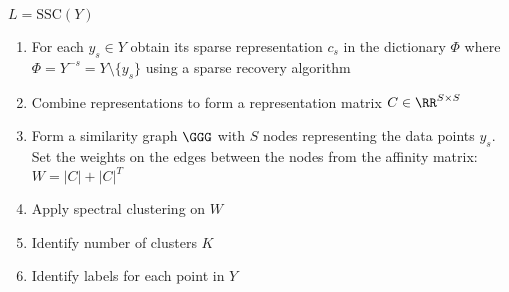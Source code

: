 \documentclass[../article_algorithms.tex]{subfiles}
\begin{document}
 
\begin{tcolorbox}[width=(\linewidth-4cm)]
\begin{algorithm}[H]
\footnotesize
\SetAlgoLined
$L = \text{SSC}(Y)$\;
\begin{enumerate}
\item For each $y_s \in Y$ obtain its sparse representation $c_s$ in the dictionary $\Phi$ where $\Phi= Y^{-s} = Y \setminus \{ y_s \}$ using a sparse recovery algorithm \;
\item Combine representations to form a representation matrix $C \in \RR^{S \times S}$ \;
\item Form a similarity graph $\GGG$ with $S$ nodes representing the data points $y_s$.\\
Set the weights on the edges between the nodes from the affinity matrix: \\
\Indp $W = | C | + | C |^T$\;
\Indm
\item Apply spectral clustering on $W$\;
\item Identify number of clusters $K$\;
\item Identify labels for each point in $Y$\;
\end{enumerate}
\end{algorithm}
\end{tcolorbox}
\end{document}
